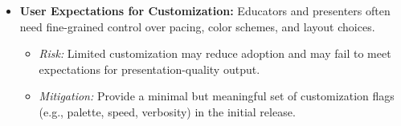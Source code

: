 \begin{itemize}
  \item \textbf{User Expectations for Customization:} Educators and presenters often need fine-grained control over pacing, color schemes, and layout choices.
  \begin{itemize}
    \item \textit{Risk:} Limited customization may reduce adoption and may fail to meet expectations for presentation-quality output.
    \item \textit{Mitigation:} Provide a minimal but meaningful set of customization flags (e.g., palette, speed, verbosity) in the initial release.
  \end{itemize}
\end{itemize}
